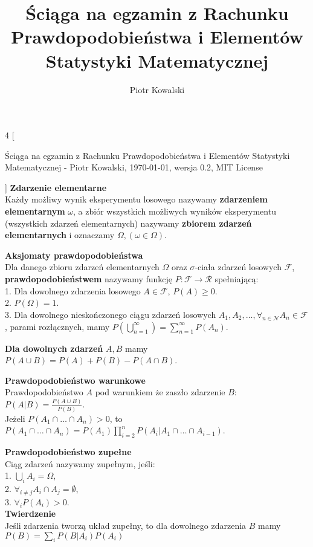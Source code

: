 \documentclass[10pt,landscape,a4paper,notitlepage]{article}
\author{Piotr Kowalski}
\title{Ściąga na egzamin z Rachunku Prawdopodobieństwa i Elementów Statystyki Matematycznej}
\begin{document}
    \begin{multicols*}{4}
        [
        \begin{center}
            \MaleMale \FemaleFemale Ściąga na egzamin z Rachunku Prawdopodobieństwa i Elementów Statystyki Matematycznej - \textcopyright Piotr Kowalski, \today , wersja 0.2, MIT License \FemaleFemale \MaleMale
        \end{center}
        ]
        \noindent\textbf{\large Zdarzenie elementarne}\\
        Każdy możliwy wynik eksperymentu losowego nazywamy \textbf{zdarzeniem elementarnym} $\omega$, a zbiór wszystkich możliwych wyników eksperymentu (wszystkich zdarzeń elementarnych) nazywamy \textbf{zbiorem zdarzeń elementarnych} i oznaczamy $\Omega, (\omega\in\Omega)$.
        
        \noindent\textbf{\large Aksjomaty prawdopodobieństwa}\\
        Dla danego zbioru zdarzeń elementarnych $\Omega$ oraz $\sigma$-ciała zdarzeń losowych $\mathcal{F}$, \textbf{prawdopodobieństwem} nazywamy funkcję $P:\mathcal{F}\rightarrow \mathcal{R}$ spełniającą:\\
        1. Dla dowolnego zdarzenia losowego $A\in\mathcal{F}$, $P(A)\geq 0$.\\
        2. $P(\Omega)=1$.\\
        3. Dla dowolnego nieskończonego ciągu zdarzeń losowych $A_1, A_2, \ldots, \forall_{n\in\mathcal{N}} A_n\in\mathcal{F}$, parami rozłącznych, mamy $P\left(\bigcup^\infty_{n=1}\right)=\sum^\infty_{n=1}P(A_n)$.

        \noindent \textbf{Dla dowolnych zdarzeń} $A, B$ mamy\\ $P(A\cup B)=P(A)+P(B)-P(A\cap B)$.

        \noindent \textbf{\large Prawdopodobieństwo warunkowe}\\
        Prawdopodobieństwo $A$ pod warunkiem że zaszło zdarzenie $B$: $P(A|B)=\frac{P(A\cup B)}{P(B)}$.\\
        Jeżeli $P(A_1\cap \ldots \cap A_n)>0$, to $P(A_1\cap \ldots \cap A_n) = P(A_1)\prod_{i=2}^nP(A_i|A_1 \cap\ldots\cap A_{i-1})$.

        \noindent \textbf{\large Prawdopodobieństwo zupełne}\\
        Ciąg zdarzeń nazywamy zupełnym, jeśli:\\
        1. $\bigcup_i A_i = \Omega$,\\
        2. $\forall_{i\neq j}A_i \cap A_j = \emptyset$,\\
        3. $\forall_i P(A_i)>0$.\\
        \textbf{Twierdzenie}\\
        Jeśli zdarzenia tworzą układ zupełny, to dla dowolnego zdarzenia $B$ mamy $P(B)=\sum_iP(B|A_i)P(A_i)$


\end{multicols*}
\end{document}
